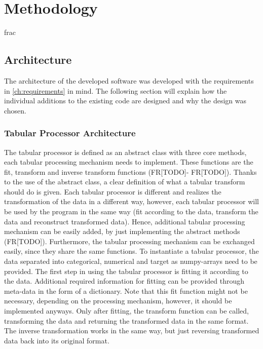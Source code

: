 \chapter{Methodology}
\label{ch:methodology}frac


\section*{Architecture}
\label{ch:architecture}

The architecture of the developed software was developed with the requirements in \autoref{ch:requirements} in mind.
The following section will explain how the individual additions to the existing code are designed and why the design was chosen.

\subsection[]{Tabular Processor Architecture}
\label{ch:architecture-tabularProcessor}

The tabular processor is defined as an abstract class with three core methods, each tabular processing mechanism needs to implement.
These functions are the fit, transform and inverse transform functions (FR[TODO]- FR[TODO]).
Thanks to the use of the abstract class, a clear definition of what a tabular transform should do is given.
Each tabular processor is different and realizes the transformation of the data in a different way, however,
each tabular processor will be used by the program in the same way (fit according to the data, transform the data and reconstruct transformed data).
Hence, additional tabular processing mechanism can be easily added, by just implementing the abstract methods (FR[TODO]).
Furthermore, the tabular processing mechanism can be exchanged easily, since they share the same functions.
To instantiate a tabular processor, the data separated into categorical, numerical and target as numpy-arrays \cite{harris2020array} need to be provided.
The first step in using the tabular processor is fitting it according to the data.
Additional required information for fitting can be provided through meta-data in the form of a dictionary.
Note that this fit function might not be necessary, depending on the processing mechanism, however, it should be implemented anyways.
Only after fitting, the transform function can be called, transforming the data and returning the transformed data in the same format.
The inverse transformation works in the same way, but just reversing transformed data back into its original format.

